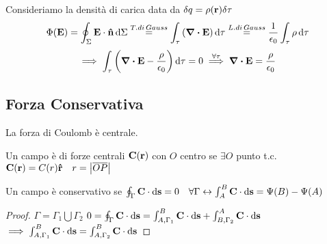 \documentclass[12pt,a4paper]{article}
\begin{document}
Consideriamo la densità di carica data da $\delta q = \rho(\vb{r})\delta\tau$
\begin{equation*}
    \Phi(\vb{E})= \oint_\Sigma \vb{E}\cdot\vu{n} \dd{\Sigma}  \overset{T. di\, Gauss}{=} \int_\tau\left( \div \vb{E} \right) \dd{\tau}
    \overset{L. di\, Gauss}{=}\frac{1}{\epsilon_0}\int_\tau\rho \dd{\tau}
\end{equation*}
\begin{equation*}
    \implies \int_\tau \left( \div \vb{E}-\frac{\rho}{\epsilon_0} \right) \dd{\tau} = 0 \overset{\forall \tau}{\implies } \div \vb{E} = \frac{\rho}{\epsilon_0}
\end{equation*}




\subsection{Forza Conservativa}
La forza di Coulomb è centrale.
\begin{definition}
    Un campo è di forze centrali $\vb{C}(\vb{r})$ con $O$ centro se $\exists O $ punto t.c. \\$\vb{C}(\vb{r})= C(r)\vu{r}\quad r = \abs{\overline{OP}}$
\end{definition}

\begin{definition}
    Un campo è conservativo se $\oint_\Gamma \vb{C}\cdot \dd{\vb{s}}= 0 \quad\forall\Gamma\leftrightarrow\int_{A}^{B}\vb{C}\cdot \dd{\vb{s}}= \Psi(B)-\Psi(A)$
\end{definition}
\begin{proof}
    $\Gamma= \Gamma_1\bigcup\Gamma_2$   \quad \quad         $0 = \oint_\Gamma \vb{C}\cdot \dd{\vb{s}}=\int_{A,\Gamma_1}^{B}\vb{C}\cdot \dd{\vb{s}}+\int_{B,\Gamma_2}^{A}\vb{C}\cdot \dd{\vb{s}}$
    \\$\implies \int_{A,\Gamma_1}^{B}\vb{C}\cdot \dd{\vb{s}}= \int_{A,\Gamma_2}^{B}\vb{C}\cdot \dd{\vb{s}}$
\end{proof}
\end{document}

